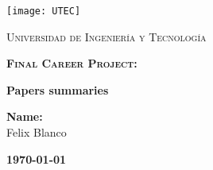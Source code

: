 \documentclass[a4paper, 10pt]{report}
\begin{document}
\begin{titlepage}
	\centering
	\texttt{[image: UTEC]} \par \vspace{1cm}
	{\scshape\LARGE Universidad de Ingeniería y Tecnología \par}
	\vspace{2cm}
	{\scshape\huge\bfseries Final Career Project: \par}
	{\huge\bfseries Papers summaries\par}
	\vspace{4cm}
	{\Large {\bfseries Name:} \\
					Felix Blanco \\
	\par}
	\vfill
	{\large\bfseries \today \par}
\end{titlepage}


\end{document}
